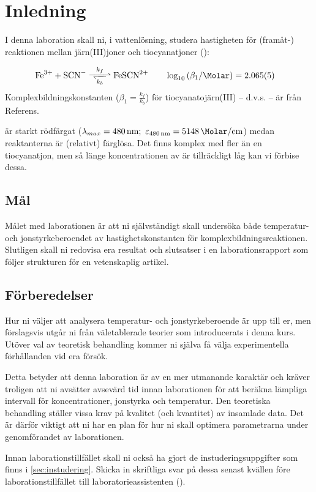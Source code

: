 \section{Inledning}
\label{sec:inledning}
I denna laboration skall ni, i vattenlösning, studera hastigheten för
(framåt-) reaktionen mellan järn(III)joner och tiocyanatjoner ():

\begin{align}
  \label{eq:equilibrium}
  \ce{Fe^3+ + SCN- <=>>[k_f][k_b] FeSCN^2+} & \hspace{2em} %
    \log_{10} \left( \beta_1 %
    / \si{\per\Molar} \right) = \num{2.065(5)} %
\end{align}
Komplexbildningskonstanten ($\beta_1 = \frac{k_f}{k_b}$) för
tiocyanatojärn(III) -- d.v.s.  -- är från
Referens\cite{peintler_improved_2000}\mbox{.}

 är starkt rödfärgat ($\lambda_{max}=\SI{480}{\nm};
~\varepsilon_{\SI{480}{\nm}} =
\SI{5148}{\per\Molar\per\centi\metre}$)
\cite{peintler_improved_2000} medan reaktanterna är (relativt) färglösa. Det finns
komplex med fler än en tiocyanatjon, men så länge koncentrationen av
 är tillräckligt låg kan vi förbise dessa.

\subsection{Mål}
Målet med laborationen är att ni självständigt skall undersöka både
temperatur- och jonstyrkeberoendet av hastighetskonstanten för
komplexbildningsreaktionen. Slutligen skall ni redovisa era resultat och
slutsatser i en laborationsrapport som följer strukturen för en
vetenskaplig artikel.

\subsection{Förberedelser}
Hur ni väljer att analysera temperatur- och jonstyrkeberoende är
upp till er, men förslagsvis utgår ni från väletablerade
teorier som introducerats i denna kurs. Utöver val av teoretisk behandling
kommer ni själva få välja experimentella förhållanden vid era försök.

Detta betyder att denna laboration är av en mer utmanande karaktär och
kräver troligen att ni avsätter avsevärd tid innan laborationen för att
beräkna lämpliga intervall för koncentrationer, jonstyrka och
temperatur. Den teoretiska behandling ställer vissa krav på kvalitet (och
kvantitet) av insamlade data. Det är därför viktigt att ni har en plan
för hur ni skall optimera parametrarna under genomförandet av laborationen.

Innan laborationstillfället skall ni också ha gjort de
instuderingsuppgifter som finns i \cref{sec:instudering}. Skicka in
skriftliga svar på dessa senast kvällen före laborationstillfället till
laboratorieassistenten (\mailto).

